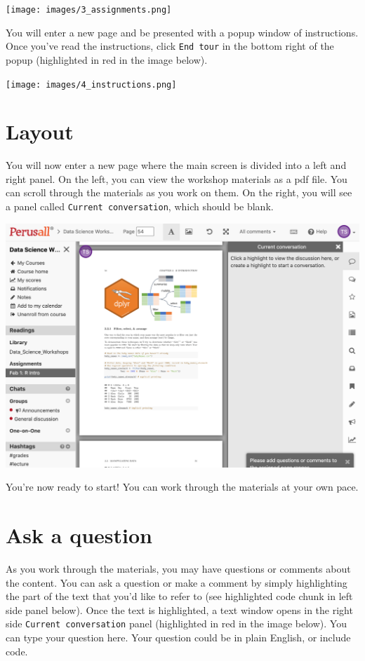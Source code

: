 \documentclass[]{book}
\begin{document}
\texttt{[image: images/3\_assignments.png]}

You will enter a new page and be presented with a popup window of instructions. Once you've read the instructions, click \texttt{End\ tour} in the bottom right of the popup (highlighted in red in the image below).

\texttt{[image: images/4\_instructions.png]}

\hypertarget{layout}{%
\section{Layout}\label{layout}}

You will now enter a new page where the main screen is divided into a left and right panel. On the left, you can view the workshop materials as a pdf file. You can scroll through the materials as you work on them. On the right, you will see a panel called \texttt{Current\ conversation}, which should be blank.

\includegraphics{images/5_layout.png}

You're now ready to start! You can work through the materials at your own pace.

\hypertarget{ask-a-question}{%
\section{Ask a question}\label{ask-a-question}}

As you work through the materials, you may have questions or comments about the content. You can ask a question or make a comment by simply highlighting the part of the text that you'd like to refer to (see highlighted code chunk in left side panel below). Once the text is highlighted, a text window opens in the right side \texttt{Current\ conversation} panel (highlighted in red in the image below). You can type your question here. Your question could be in plain English, or include code.
\end{document}
